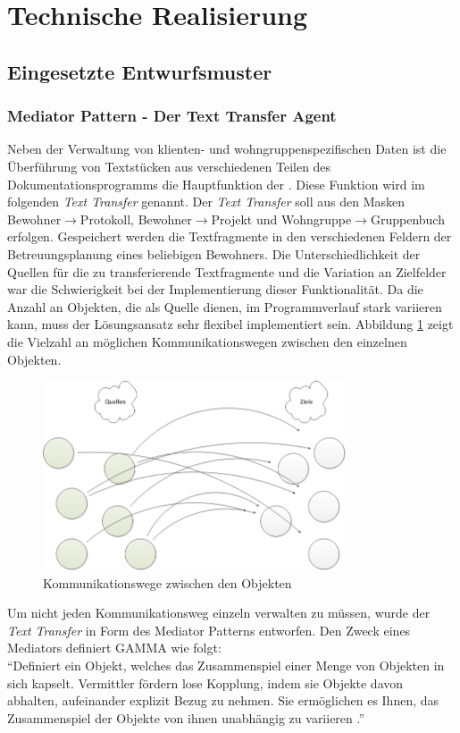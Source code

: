 \section{Technische Realisierung}

\subsection{Eingesetzte Entwurfsmuster}
\subsubsection{Mediator Pattern - Der Text Transfer Agent}
Neben der Verwaltung von klienten- und wohngruppenspezifischen Daten ist die Überführung von Textstücken aus verschiedenen Teilen des
Dokumentationsprogramms die Hauptfunktion der \EBP. Diese Funktion wird im folgenden \textit{Text Transfer} genannt. \newline
Der \textit{Text Transfer} soll aus den Masken Bewohner$\rightarrow$Protokoll, Bewohner$\rightarrow$Projekt und Wohngruppe$\rightarrow$Gruppenbuch
erfolgen. Gespeichert werden die Textfragmente in den verschiedenen Feldern der Betreuungsplanung eines beliebigen Bewohners. Die Unterschiedlichkeit
der Quellen für die zu transferierende Textfragmente und die Variation an Zielfelder war die Schwierigkeit bei der Implementierung dieser
Funktionalität. Da die Anzahl an Objekten, die als Quelle dienen, im Programmverlauf stark variieren kann, muss der Lösungsansatz sehr flexibel
implementiert sein. Abbildung \ref{unstrukturiert} zeigt die Vielzahl an möglichen Kommunikationswegen zwischen den einzelnen Objekten.\\
\begin{figure}[htp]
	\includegraphics[width=0.8\textwidth]{unmediated}
	\caption{Kommunikationswege zwischen den Objekten}
	\label{unstrukturiert}
\end{figure}
Um nicht jeden Kommunikationsweg einzeln verwalten zu müssen, wurde der \textit{Text Transfer} in Form des Mediator Patterns entworfen. Den Zweck
eines Mediators definiert GAMMA wie folgt: \\
``Definiert ein Objekt, welches das Zusammenspiel einer Menge von Objekten in sich kapselt. Vermittler fördern lose Kopplung, indem sie Objekte davon
abhalten, aufeinander explizit Bezug zu nehmen. Sie ermöglichen es Ihnen, das Zusammenspiel der Objekte von ihnen unabhängig zu
variieren \cite[S. 385]{Entwurfsmuster}.''

